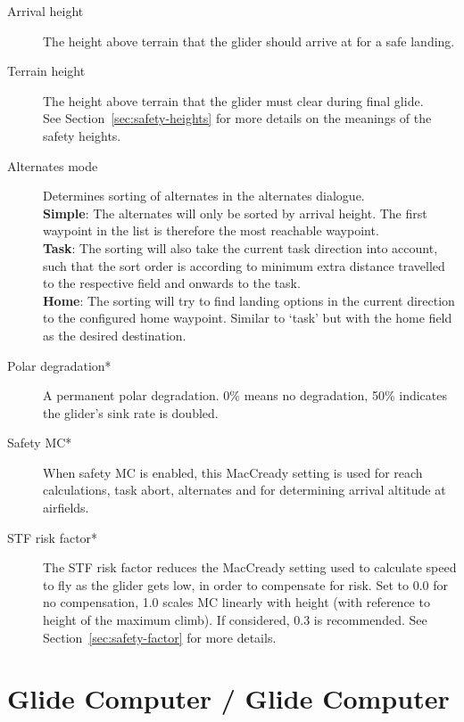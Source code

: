 \begin{description}
\item[Arrival height]  The height above terrain that the glider
  should arrive at for a safe landing.
\item[Terrain height]  \label{conf:safetyterrain} The height above terrain that 
  the glider must clear during final glide. \\
See Section~\ref{sec:safety-heights} for more details on the meanings
of the safety heights. \\
\item[Alternates mode]  \label{conf:alternatesmode} Determines sorting of alternates 
  in the alternates dialogue. \\
  {\bf Simple}: The alternates will only be sorted by arrival height. 
    The first waypoint in the list is therefore the most reachable waypoint. \\
  {\bf Task}: The sorting will also take the current task direction into account, 
    such that the sort order is according to minimum extra distance travelled to 
    the respective field and onwards to the task. \\
  {\bf Home}: The sorting will try to find landing options in the current direction 
    to the configured home waypoint.  Similar to `task' but with 
    the home field as the desired destination.
\item[Polar degradation*]  A permanent polar degradation. 0\% means no degradation, 
  50\% indicates the glider's sink rate is doubled.
\item[Safety MC*]  When safety MC is enabled, this MacCready setting is used for reach 
  calculations, task abort, alternates and for determining arrival altitude at airfields.\label{conf:safetyMC} 
\item[STF risk factor*] 
  The STF risk factor reduces the MacCready setting used to calculate
  speed to fly as the glider gets low, in order to compensate for
  risk.  Set to 0.0 for no compensation, 1.0 scales MC linearly with
  height (with reference to height of the maximum climb). If considered, 0.3 is recommended.  
  See Section~\ref{sec:safety-factor} for more details.
\end{description}


\section{Glide Computer / Glide Computer}\label{sec:final-glide}\label{conf:final-glide}	

